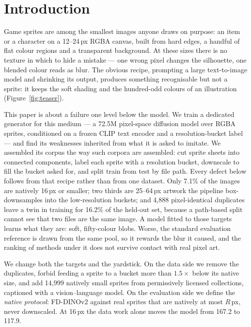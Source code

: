 \documentclass[10pt,twocolumn,letterpaper]{article}
\begin{document}
\section{Introduction}
\label{sec:intro}

Game sprites are among the smallest images anyone draws on purpose: an item or a character on a 12--24\,px RGBA canvas,
built from hard edges, a handful of flat colour regions and a transparent background. At these sizes there is no
texture in which to hide a mistake --- one wrong pixel changes the silhouette, one blended colour reads as blur. The
obvious recipe, prompting a large text-to-image model and shrinking its output, produces something recognisable but not
a sprite: it keeps the soft shading and the hundred-odd colours of an illustration (Figure~\ref{fig:teaser}).

This paper is about a failure one level below the model. We train a dedicated generator for this medium --- a 72.5M
pixel-space diffusion model over RGBA sprites, conditioned on a frozen CLIP text encoder and a resolution-bucket label
--- and find its weaknesses inherited from what it is asked to imitate. We assembled its corpus the way such corpora
are assembled: cut sprite sheets into connected components, label each sprite with a resolution bucket, downscale to
fill the bucket asked for, and split train from test by file path. Every defect below follows from that recipe rather
than from one dataset. Only 7.1\% of the images are natively 16\,px or smaller; two thirds are 25--64\,px artwork the
pipeline box-downsamples into the low-resolution buckets; and 4{,}888 pixel-identical duplicates leave a twin in
training for 16.2\% of the held-out set, because a path-based split cannot see that two files are the same image. A model fitted to those targets learns what they are: soft, fifty-colour blobs. Worse, the standard
evaluation reference is drawn from the same pool, so it rewards the blur it caused, and the ranking of methods under it
does not survive contact with real pixel art.

We change both the targets and the yardstick. On the data side we remove the duplicates, forbid feeding a sprite to a
bucket more than $1.5\times$ below its native size, and add 14{,}999 natively small sprites from permissively licensed
collections, captioned with a vision--language model. On the evaluation side we define the \emph{native protocol}:
FD-DINOv2 against real sprites that are natively at most $R$\,px, never downscaled. At 16\,px the data work alone moves
the model from 167.2 to 117.9.
\end{document}
